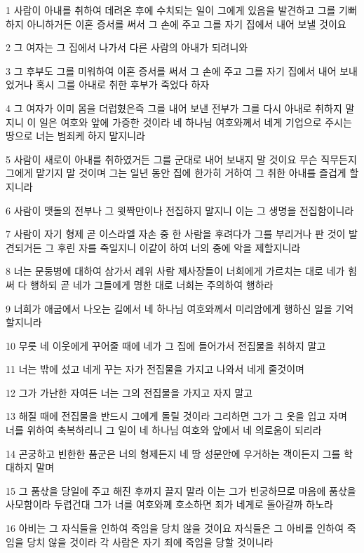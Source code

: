 \par 1 사람이 아내를 취하여 데려온 후에 수치되는 일이 그에게 있음을 발견하고 그를 기뻐하지 아니하거든 이혼 증서를 써서 그 손에 주고 그를 자기 집에서 내어 보낼 것이요
\par 2 그 여자는 그 집에서 나가서 다른 사람의 아내가 되려니와
\par 3 그 후부도 그를 미워하여 이혼 증서를 써서 그 손에 주고 그를 자기 집에서 내어 보내었거나 혹시 그를 아내로 취한 후부가 죽었다 하자
\par 4 그 여자가 이미 몸을 더럽혔은즉 그를 내어 보낸 전부가 그를 다시 아내로 취하지 말지니 이 일은 여호와 앞에 가증한 것이라 네 하나님 여호와께서 네게 기업으로 주시는 땅으로 너는 범죄케 하지 말지니라
\par 5 사람이 새로이 아내를 취하였거든 그를 군대로 내어 보내지 말 것이요 무슨 직무든지 그에게 맡기지 말 것이며 그는 일년 동안 집에 한가히 거하여 그 취한 아내를 즐겁게 할지니라
\par 6 사람이 맷돌의 전부나 그 윗짝만이나 전집하지 말지니 이는 그 생명을 전집함이니라
\par 7 사람이 자기 형제 곧 이스라엘 자손 중 한 사람을 후려다가 그를 부리거나 판 것이 발견되거든 그 후린 자를 죽일지니 이같이 하여 너의 중에 악을 제할지니라
\par 8 너는 문둥병에 대하여 삼가서 레위 사람 제사장들이 너희에게 가르치는 대로 네가 힘써 다 행하되 곧 네가 그들에게 명한 대로 너희는 주의하여 행하라
\par 9 너희가 애굽에서 나오는 길에서 네 하나님 여호와께서 미리암에게 행하신 일을 기억할지니라
\par 10 무릇 네 이웃에게 꾸어줄 때에 네가 그 집에 들어가서 전집물을 취하지 말고
\par 11 너는 밖에 섰고 네게 꾸는 자가 전집물을 가지고 나와서 네게 줄것이며
\par 12 그가 가난한 자여든 너는 그의 전집물을 가지고 자지 말고
\par 13 해질 때에 전집물을 반드시 그에게 돌릴 것이라 그리하면 그가 그 옷을 입고 자며 너를 위하여 축복하리니 그 일이 네 하나님 여호와 앞에서 네 의로움이 되리라
\par 14 곤궁하고 빈한한 품군은 너의 형제든지 네 땅 성문안에 우거하는 객이든지 그를 학대하지 말며
\par 15 그 품삯을 당일에 주고 해진 후까지 끌지 말라 이는 그가 빈궁하므로 마음에 품삯을 사모함이라 두렵건대 그가 너를 여호와께 호소하면 죄가 네게로 돌아갈까 하노라
\par 16 아비는 그 자식들을 인하여 죽임을 당치 않을 것이요 자식들은 그 아비를 인하여 죽임을 당치 않을 것이라 각 사람은 자기 죄에 죽임을 당할 것이니라
